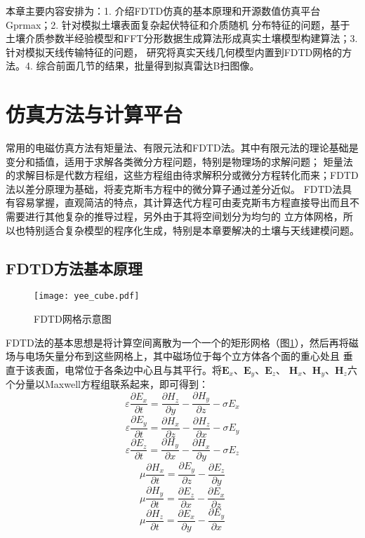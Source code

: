 本章主要内容安排为：1. 介绍FDTD仿真的基本原理和开源数值仿真平台Gprmax；2. 针对模拟土壤表面复杂起伏特征和介质随机
分布特征的问题，基于土壤介质参数半经验模型和FFT分形数据生成算法形成真实土壤模型构建算法；3. 针对模拟天线传输特征的问题，
研究将真实天线几何模型内置到FDTD网格的方法。4. 综合前面几节的结果，批量得到拟真雷达B扫图像。
\section{仿真方法与计算平台}
常用的电磁仿真方法有矩量法、有限元法和FDTD法。其中有限元法的理论基础是变分和插值，适用于求解各类微分方程问题，特别是物理场的求解问题；
矩量法的求解目标是代数方程组，这些方程组由待求解积分或微分方程转化而来；FDTD法以差分原理为基础，将麦克斯韦方程中的微分算子通过差分近似。
FDTD法具有容易掌握，直观简洁的特点，其计算迭代方程可由麦克斯韦方程直接导出而且不需要进行其他复杂的推导过程，另外由于其将空间划分为均匀的
立方体网格，所以也特别适合复杂模型的程序化生成，特别是本章要解决的土壤与天线建模问题。
\subsection{FDTD方法基本原理}
\begin{figure}[htbp]
	\texttt{[image: yee\_cube.pdf]}
	\caption{FDTD网格示意图}
	\label{yee_cube}
\end{figure}

FDTD法的基本思想是将计算空间离散为一个一个的矩形网格（图\ref{yee_cube}），然后再将磁场与电场矢量分布到这些网格上，其中磁场位于每个立方体各个面的重心处且
垂直于该表面，电常位于各条边中心且与其平行。将$\mathbf{E}_x$、$\mathbf{E}_y$、$\mathbf{E}_z$、
$\mathbf{H}_x$、$\mathbf{H}_y$、$\mathbf{H}_z$六个分量以Maxwell方程组联系起来，即可得到：
\begin{equation} 
\varepsilon \frac{\partial E_{x}}{\partial t}=\frac{\partial H_{z}}{\partial y}-\frac{\partial H_{y}}{\partial z}-\sigma E_{x}
\label{eqn:maxwell_1} 
\end{equation}
 \begin{equation} 
 \varepsilon \frac{\partial E_{y}}{\partial t}=\frac{\partial H_{x}}{\partial z}-\frac{\partial H_{z}}{\partial x}-\sigma E_{y}
  \end{equation}
  \begin{equation} 
  \varepsilon \frac{\partial E_{z}}{\partial t}=\frac{\partial H_{y}}{\partial x}-\frac{\partial H_{x}}{\partial y}-\sigma E_{z}
   \end{equation}
   \begin{equation} 
\mu \frac{\partial H_{x}}{\partial t}=\frac{\partial E_{y}}{\partial z}-\frac{\partial E_{z}}{\partial y}
 \end{equation}
 \begin{equation} 
\mu \frac{\partial H_{y}}{\partial t}=\frac{\partial E_{z}}{\partial x}-\frac{\partial E_{x}}{\partial z}
 \end{equation}
 \begin{equation} 
	\label{eqn:maxwell_6}
\mu \frac{\partial H_{z}}{\partial t}=\frac{\partial E_{x}}{\partial y}-\frac{\partial E_{y}}{\partial x}
 \end{equation}

